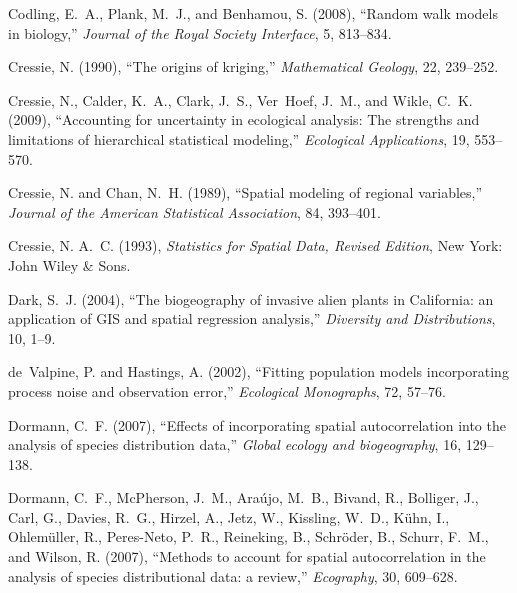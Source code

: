 \documentclass[11pt, titlepage]{article}\usepackage[]{graphicx}\usepackage[]{color}
\begin{document}
\begin{spacing}{1.9}
\begin{flushleft}
\begin{thebibliography}{126}
Codling, E.~A., Plank, M.~J., and Benhamou, S. (2008), \enquote{Random walk
  models in biology,} \textit{Journal of the Royal Society Interface}, 5,
  813--834.

Cressie, N. (1990), \enquote{The origins of kriging,} \textit{Mathematical
  Geology}, 22, 239--252.

Cressie, N., Calder, K.~A., Clark, J.~S., Ver~Hoef, J.~M., and Wikle, C.~K.
  (2009), \enquote{Accounting for uncertainty in ecological analysis: {T}he
  strengths and limitations of hierarchical statistical modeling,}
  \textit{Ecological Applications}, 19, 553--570.

Cressie, N. and Chan, N.~H. (1989), \enquote{Spatial modeling of regional
  variables,} \textit{Journal of the American Statistical Association}, 84,
  393--401.

Cressie, N. A.~C. (1993), \textit{Statistics for Spatial Data, Revised
  Edition}, New York: John Wiley \& Sons.

Dark, S.~J. (2004), \enquote{The biogeography of invasive alien plants in
  California: an application of GIS and spatial regression analysis,}
  \textit{Diversity and Distributions}, 10, 1--9.

de~Valpine, P. and Hastings, A. (2002), \enquote{Fitting population models
  incorporating process noise and observation error,} \textit{Ecological
  Monographs}, 72, 57--76.

Dormann, C.~F. (2007), \enquote{Effects of incorporating spatial
  autocorrelation into the analysis of species distribution data,}
  \textit{Global ecology and biogeography}, 16, 129--138.

Dormann, C.~F., McPherson, J.~M., Ara{\'u}jo, M.~B., Bivand, R., Bolliger, J.,
  Carl, G., Davies, R.~G., Hirzel, A., Jetz, W., Kissling, W.~D., K{\"u}hn, I.,
  Ohlem{\"u}ller, R., Peres-Neto, P.~R., Reineking, B., Schr{\"o}der, B.,
  Schurr, F.~M., and Wilson, R. (2007), \enquote{Methods to account for spatial
  autocorrelation in the analysis of species distributional data: a review,}
  \textit{Ecography}, 30, 609--628.


\end{thebibliography}
\end{flushleft}
\end{spacing}
\end{document}

